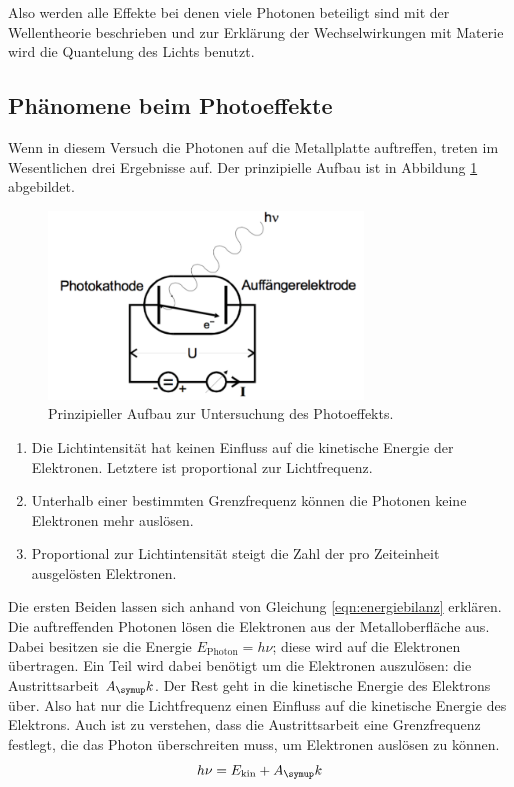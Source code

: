 Also werden alle Effekte bei denen viele Photonen beteiligt sind mit
der Wellentheorie beschrieben und zur Erklärung der Wechselwirkungen mit Materie
wird die Quantelung des Lichts benutzt.

\subsection{Phänomene beim Photoeffekte}
\label{sec:phaenomene}

Wenn in diesem Versuch die Photonen auf die Metallplatte auftreffen, treten
im Wesentlichen drei Ergebnisse auf. Der prinzipielle Aufbau ist in Abbildung
\ref{fig:prinzipaufbau} abgebildet.

\begin{figure}[H]
  \centering
  \includegraphics[height = 5cm]{NacktbilderMilaKunis/prinzipaufbau.pdf}
  \caption{Prinzipieller Aufbau zur Untersuchung des Photoeffekts\cite{anleitung}.}
  \label{fig:prinzipaufbau}
\end{figure}

\begin{enumerate}
  \item Die Lichtintensität hat keinen Einfluss auf die kinetische Energie
  der Elektronen. Letztere ist proportional zur Lichtfrequenz.
  \item Unterhalb einer bestimmten Grenzfrequenz können die Photonen
  keine Elektronen mehr auslösen.
  \item Proportional zur Lichtintensität steigt die Zahl der pro Zeiteinheit
  ausgelösten Elektronen.
\end{enumerate}

Die ersten Beiden lassen sich anhand von Gleichung \eqref{eqn:energiebilanz}
erklären. Die auftreffenden Photonen lösen die Elektronen aus der Metalloberfläche aus.
Dabei besitzen sie die Energie $E_\text{Photon} = h \nu$; diese wird
auf die Elektronen übertragen. Ein Teil wird dabei benötigt um die Elektronen
auszulösen: die Austrittsarbeit $A_\g{k}$. Der Rest geht in die kinetische Energie
des Elektrons über.
Also hat nur die Lichtfrequenz einen Einfluss auf die kinetische Energie
des Elektrons.
Auch ist zu verstehen, dass die Austrittsarbeit eine Grenzfrequenz festlegt, die
das Photon überschreiten muss, um Elektronen auslösen zu können.
\begin{equation}
  h \nu = E_\text{kin} + A_\g{k}
  \label{eqn:energiebilanz}
\end{equation}

